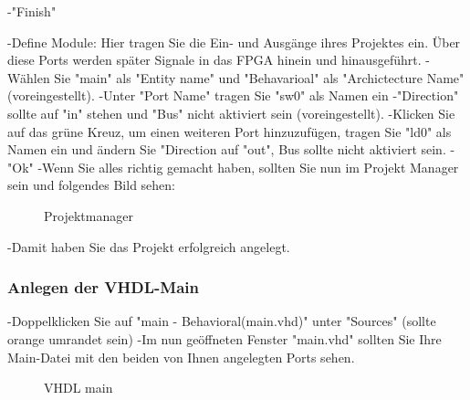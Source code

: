 \documentclass{article}
\begin{document}
-"Finish"\newline
\newline

-Define Module: Hier tragen Sie die Ein- und Ausgänge ihres Projektes ein. \"Uber diese Ports werden später Signale in das FPGA hinein und hinausgeführt.\newline
-W\"ahlen Sie "main" als "Entity name" und "Behavarioal" als "Archictecture Name" (voreingestellt).\newline
-Unter "Port Name" tragen Sie "sw0" als Namen ein\newline
-"Direction" sollte auf "in" stehen und "Bus" nicht aktiviert sein (voreingestellt).\newline
-Klicken Sie auf das gr\"une Kreuz, um einen weiteren Port hinzuzufügen, tragen Sie "ld0" als Namen ein und \"andern Sie "Direction auf "out", Bus sollte nicht aktiviert sein.\newline
-"Ok"\newline
-Wenn Sie alles richtig gemacht haben, sollten Sie nun im Projekt Manager sein und folgendes Bild sehen:\newline

\begin{figure}[H]
\begin{center}
\caption{Projektmanager}
\end{center}
\end{figure}

-Damit haben Sie das Projekt erfolgreich angelegt.\newline

\subsubsection{Anlegen der VHDL-Main}
-Doppelklicken Sie auf "main - Behavioral(main.vhd)" unter "Sources" (sollte orange umrandet sein)\newline
-Im nun ge\"offneten Fenster "main.vhd" sollten Sie Ihre Main-Datei mit den beiden von Ihnen angelegten Ports sehen.\newline

\begin{figure}[H]
\begin{center}
\caption{VHDL main}
\end{center}
\end{figure}
\end{document}
